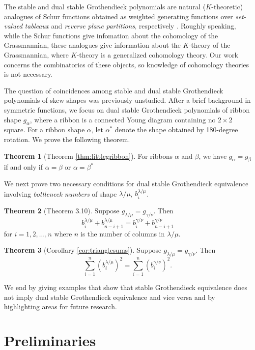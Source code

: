 \documentclass[12pt]{amsart}
\theoremstyle{definition}
\newtheorem*{thm*}{Theorem}
\begin{document}
The stable and dual stable Grothendieck polynomials are natural ($K$-theoretic) analogues of Schur functions obtained as weighted generating functions over \textit{set-valued tableaux} and \textit{reverse plane partitions}, respectively \cite{buch2002lrrule,lam2007combinatorial}. Roughly speaking, while the Schur functions give infomation about the cohomology of the Grassmannian, these analogues give information about the $K$-theory of the Grassmannian, where $K$-theory is a generalized cohomology theory. Our work concerns the combinatorics of these objects, so knowledge of cohomology theories is not necessary.

The question of coincidences among 
stable and dual stable Grothendieck polynomials of skew shapes was previously unstudied. After a brief background in symmetric functions, we focus on dual stable Grothendieck polynomials of ribbon shape $g_\alpha$, where a ribbon is a connected Young diagram containing no $2\times 2$ square. For a ribbon shape $\alpha$, let $\alpha^*$ denote the shape obtained by 180-degree rotation. We prove the following theorem.

\begin{thm*}[Theorem \ref{thm:littlegribbon}] 
For ribbons $\alpha$ and $\beta$, we have $g_\alpha = g_\beta$ if and only if $\alpha = \beta$ or $\alpha = \beta^*$
\end{thm*}

We next prove two necessary conditions for dual stable Grothendieck equivalence involving \textit{bottleneck numbers} of shape $\lambda/\mu$, $b_i^{\lambda/\mu}$.

\begin{thm*}[Theorem 3.10]
Suppose $g_{\lambda / \mu} = g_{\gamma / \nu}$. Then
\[
 b_i^{\lambda / \mu}+b_{n-i+1}^{\lambda  / \mu} = b_i^{\gamma / \nu}+b_{n-i+1}^{\gamma / \nu}
\]
for $i=1,2,\ldots,n$ where $n$ is the number of columns in $\lambda / \mu$.
\end{thm*}

\begin{thm*}[Corollary \ref{cor:trianglesums}]
Suppose $g_{\lambda/\mu} = g_{\gamma/\nu}$. Then
\[
\sum_{i=1}^n (b_i^{\lambda/\mu})^2 = \sum_{i=1}^n (b_i^{\gamma/\nu})^2.
\]
\end{thm*}

We end by giving examples that show that stable Grothendieck equivalence does not imply dual stable Grothendieck equivalence and vice versa and by highlighting areas for future research.

\section{Preliminaries}
\end{document}
